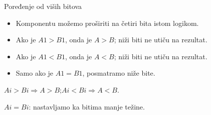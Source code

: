 \begin{frame}[label=05-s003]{Poređenje od viših bitova}
\begin{itemize}
\item Komponentu možemo proširiti na četiri bita istom logikom.
\item Ako je $A1>B1$, onda je $A>B$; niži biti ne utiču na rezultat.
\item Ako je $A1<B1$, onda je $A<B$; niži biti ne utiču na rezultat.
\item Samo ako je $A1=B1$, posmatramo niže bite.
\end{itemize}
\medskip
{}
\medskip
$Ai>Bi\Rightarrow A>B$;\quad $Ai<Bi\Rightarrow A<B$.\par
$Ai=Bi$: nastavljamo ka bitima manje težine.
\end{frame}
